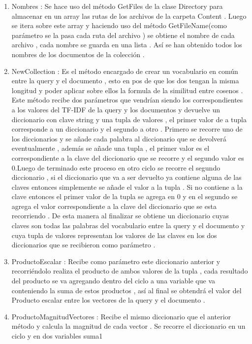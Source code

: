 \documentclass[10pt]{extarticle}
\begin{document}
\begin{enumerate}
	\item  Nombres : Se hace uso del método GetFiles de la clase Directory para 
	almacenar en un array las rutas de los archivos de la carpeta Content . Luego se itera sobre este 
	array y haciendo uso del método GetFileName(como parámetro se la pasa cada ruta del archivo ) 
	se obtiene el nombre de cada archivo , cada nombre se guarda en una lista . Así se han obtenido
	todos los nombres de los documentos de la colección . 
	\item NewCollection : Es el método encargado de crear un vocabulario en común entre la 
	query y el documento , esto en pos de que los dos tengan la misma longitud y poder aplicar sobre 
	ellos la formula de la similitud entre cosenos . Este método recibe dos parámetros que vendrían 
	siendo los correspondientes a los valores del TF-IDF de la query y los documentos y devuelve un 
	diccionario con clave string y una 	tupla de valores , el primer valor de a tupla corresponde a un diccionario y el segundo a otro . 
	Primero se recorre uno de los diccionarios y se añade cada palabra al diccionario que se devolverá 
	eventualmente , además se añade una tupla , el primer valor es el correspondiente a la clave del 
	diccionario que se recorre y el segundo valor es 0.Luego de terminado este proceso en otro ciclo 
	se recorre el segundo diccionario , si el diccionario que va a ser devuelto ya contiene alguna de las 
	claves entonces simplemente se añade el valor a la tupla . Si no contiene a la clave entonces el 
	primer valor de la tupla se agrega en 0 y en el segundo se agrega el valor correspondiente a la 
	clave del diccionario que se esta recorriendo . De esta manera al finalizar se obtiene un diccionario 
	cuyas claves son todas las palabras del vocabulario entre la query y el documento y cuya tupla de 
	valores representan los valores de las claves en los dos diccionarios que se recibieron como 
	parámetro . 
	\item ProductoEscalar : Recibe como parámetro este diccionario anterior y recorriéndolo 
	realiza el producto de ambos valores de la tupla , cada resultado del producto se va agregando 
	dentro del ciclo a una variable que va conteniendo la suma de estos productos , así al final se 
	obtendrá el valor del Producto escalar entre los vectores de la query y el documento . 
	\item ProductoMagnitudVectores : Recibe el mismo diccionario que el anterior método y 
	calcula la magnitud de cada vector . Se recorre el diccionario en un ciclo y en dos variables suma1 

\end{enumerate}
\end{document}
